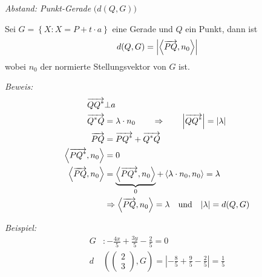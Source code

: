 \begin{mylemma}\textit{Abstand: Punkt-Gerade} $\big( d(Q,G) \big)$\\

    \begin{minipage}{0.6\textwidth}
        Sei $G = \left\{ X : X = P+t \cdot a \right\}$ eine Gerade und $Q$ ein Punkt, dann ist
        \begin{align*}
            d(Q,G) = \left| \left\langle \overrightarrow{PQ} , n_0 \right\rangle \right|
        \end{align*}
        wobei $n_0$ der normierte Stellungsvektor von $G$ ist.
    \end{minipage}
    \begin{minipage}{0.4\textwidth}
        \begin{center}
        \end{center}
    \end{minipage}

    \textit{Beweis:}
    \begin{align*}
        \overrightarrow{QQ^*} & \bot a\\
        \overrightarrow{Q^*Q} & = \lambda \cdot n_0 \qquad \Rightarrow \qquad \left| \overrightarrow{QQ^*} \right| = \left| \lambda \right|\\
        \overrightarrow{PQ} & = \overrightarrow{PQ^*}  + \overrightarrow{Q^*Q}\\
        \left\langle \overrightarrow{PQ^*} , n_0 \right\rangle & = 0\\
        \left\langle \overrightarrow{PQ} , n_0 \right\rangle & = \underbrace{\left\langle \overrightarrow{PQ^*} , n_0 \right\rangle}_{0} + \left\langle \lambda \cdot n_0, n_0 \right\rangle = \lambda\\
        & \Rightarrow \left\langle \overrightarrow{PQ} , n_0 \right\rangle = \lambda \quad \text{und} \quad |\lambda| = d(Q,G)
    \end{align*}
\end{mylemma}
\textit{Beispiel:}
\begin{align*}
    G & : -\frac{4x}{5} + \frac{3y}{5} - \frac{2}{5} = 0\\
    d & \left(
    \begin{pmatrix}
        2\\3
    \end{pmatrix}
    ,G
    \right)
    =
    \left| -\frac{8}{5} + \frac{9}{5} - \frac{2}{5}  \right| = \frac{1}{5}
\end{align*}

\begin{mylemma}

\end{mylemma}

